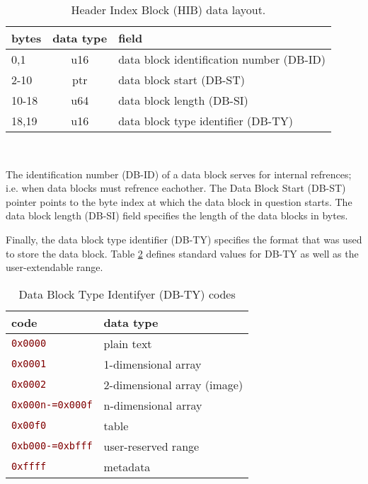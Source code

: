 \documentclass[pagesize=a4]{tufte-book}
\makeatletter
\newcommand{\hlred}[1]{\textcolor{Maroon}{#1}}%
\newcommand{\hex}[1]{\hlred{\texttt{#1}}\label{clsopt:#1}\index{#1 class option@\texttt{#1} class option}\index{class options!#1@\texttt{#1}}}%
\makeatother
\begin{document}
\begin{table}[ht]
	\centering
	\selectfont
	\begin{tabular}{lcl}
		\toprule
		bytes & data type & field\\
		\midrule
		0,1 & u16 & data block identification number (DB-ID)\\
		2-10 & ptr & data block start (DB-ST)\\
		10-18 & u64 & data block length (DB-SI)\\
		18,19 & u16 & data block type identifier (DB-TY)\\
		\bottomrule
	\end{tabular}
	~\label{tab:hib_fields}
	\caption{Header Index Block (HIB) data layout.}	
\end{table}
\vspace{5mm}

The identification number (DB-ID) of a data block serves for internal refrences; i.e. when data blocks must refrence eachother. The Data Block Start (DB-ST) pointer points to the byte index at which the data block in question starts. The data block length (DB-SI) field specifies the length of the data blocks in bytes.

Finally, the data block type identifier (DB-TY) specifies the format that was
used to store the data block. Table \ref{tab:data_block_type_codes} defines standard values for DB-TY as well as the user-extendable range.

\begin{table}[ht]
	\centering
	\selectfont
	\begin{tabular}{ll}
		\toprule
		code & data type\\
		\midrule
		\hex{0x0000} & plain text\\
		\hex{0x0001} & 1-dimensional array\\
		\hex{0x0002} & 2-dimensional array (image)\\
		\hex{0x000n-=0x000f} & n-dimensional array\\
		\hex{0x00f0} & table\\
		\hex{0xb000-=0xbfff} & user-reserved range\\
		\hex{0xffff} & metadata\\
		\bottomrule
	\end{tabular}
	~\label{tab:data_block_type_codes}
	\caption{Data Block Type Identifyer (DB-TY) codes}
\end{table}
\vspace{5mm}
\end{document}
